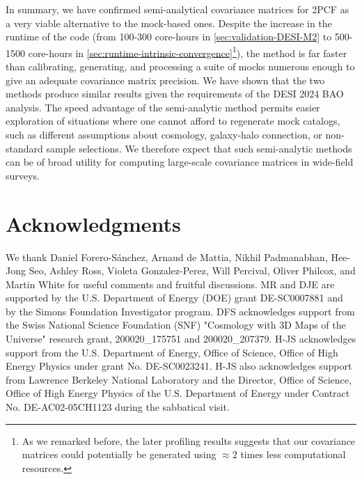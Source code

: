 In summary, we have confirmed \rascalc{} semi-analytical covariance matrices for 2PCF as a very viable alternative to the mock-based ones.
Despite the increase in the runtime of the \rascalc{} code (from 100-300 core-hours in \cref{sec:validation-DESI-M2} to 500-1500 core-hours in \cref{sec:runtime-intrinsic-convergence}\footnote{As we remarked before, the later profiling results suggests that our covariance matrices could potentially be generated using $\approx 2$ times less computational resources.}), the method is far faster than calibrating, generating, and processing a suite of mocks numerous enough to give an adequate covariance matrix precision.
We have shown that the two methods produce similar results given the requirements of the DESI 2024 BAO analysis.
The speed advantage of the semi-analytic method permits easier exploration of situations where one cannot afford to regenerate mock catalogs, such as different assumptions about cosmology, galaxy-halo connection, or non-standard sample selections.
We therefore expect that such semi-analytic methods can be of broad utility for computing large-scale covariance matrices in wide-field surveys.

\section*{Acknowledgments}

We thank Daniel Forero-S\'anchez, Arnaud de Mattia, Nikhil Padmanabhan, Hee-Jong Seo, Ashley Ross, Violeta Gonzalez-Perez, Will Percival, Oliver Philcox, and Martin White for useful comments and fruitful discussions.
MR and DJE are supported by the U.S. Department of Energy (DOE) grant DE-SC0007881 and by the Simons Foundation Investigator program.
DFS acknowledges support from the Swiss National Science Foundation (SNF) "Cosmology with 3D Maps of the Universe" research grant, 200020\_175751 and 200020\_207379.
H-JS acknowledges support from the U.S. Department of Energy, Office of Science, Office of High Energy Physics under grant No. DE-SC0023241. H-JS also acknowledges support from Lawrence Berkeley National Laboratory and the Director, Office of Science, Office of High Energy Physics of the U.S. Department of Energy under Contract No. DE-AC02-05CH1123 during the sabbatical visit.


